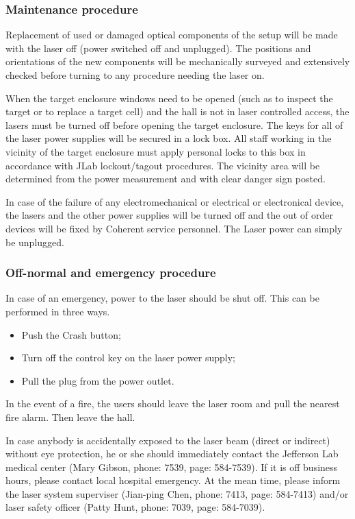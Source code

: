 \subsubsection{Maintenance procedure}

Replacement of used or damaged optical components of the setup will be made with the
laser off (power switched off and unplugged).  The positions and orientations of the new components will be mechanically
surveyed and extensively checked before turning to any procedure needing the laser on.

When the target enclosure windows need to be opened (such as to inspect
the target or to replace a 
target cell) and the hall is not in laser controlled access, 
the lasers must be turned off before opening the target enclosure.
The keys for all of the laser power
supplies will be secured in a lock box.  All staff working in the
vicinity of the target enclosure 
must apply personal locks to this box in accordance with
JLab lockout/tagout procedures.
The vicinity area will be determined
from the power measurement and with clear danger sign posted.

In case of the failure of any electromechanical or electrical or electronical device,
the lasers and the other power supplies will be turned off and the out of order devices
will be fixed by Coherent service personnel. The Laser power
can simply be unplugged.


\subsubsection{Off-normal and emergency procedure}

In case of an emergency, power to the laser should be shut off.
This can be performed in three ways.
\begin {itemize}
\item Push the Crash button;
\item Turn off the control key on the laser power supply;
\item Pull the plug from the power outlet.
\end {itemize}

In the event of a fire, the users should leave the laser room and pull the 
nearest fire alarm. Then leave the hall.

In case anybody is accidentally exposed to the laser beam (direct or indirect)
without eye protection, he or she should immediately contact the Jefferson
Lab medical center (Mary Gibson, phone: 7539, page: 584-7539). If it is 
off business hours, please contact local hospital emergency. At the mean time,
please inform the laser system superviser (Jian-ping Chen, phone: 7413,
page: 584-7413) and/or laser safety officer (Patty Hunt, phone: 7039,
page: 584-7039). 


